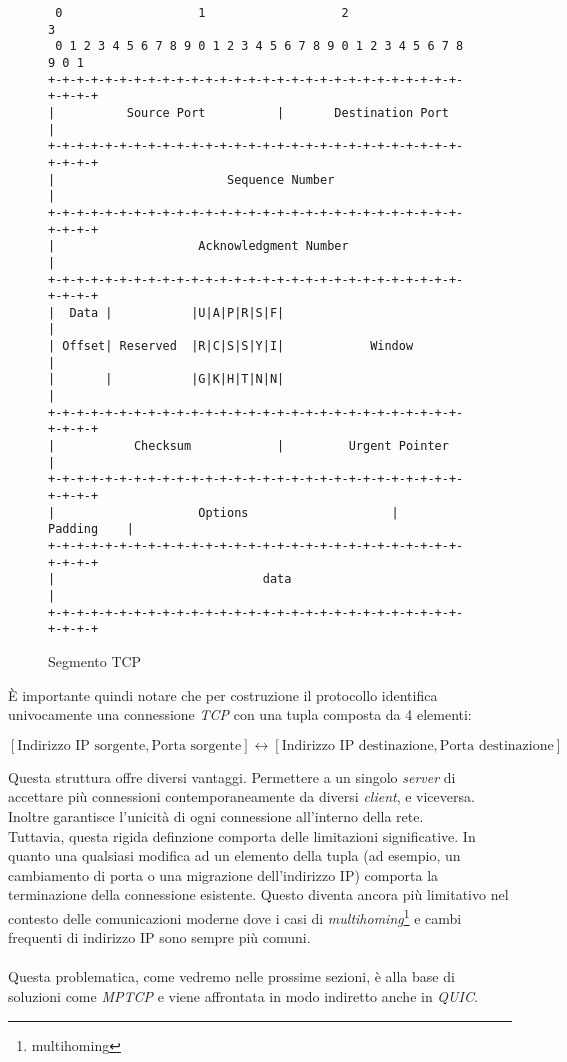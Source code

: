 \begin{figure}[!h]
\centering
\begin{BVerbatim}
 0                   1                   2                   3   
 0 1 2 3 4 5 6 7 8 9 0 1 2 3 4 5 6 7 8 9 0 1 2 3 4 5 6 7 8 9 0 1 
+-+-+-+-+-+-+-+-+-+-+-+-+-+-+-+-+-+-+-+-+-+-+-+-+-+-+-+-+-+-+-+-+
|          Source Port          |       Destination Port        |
+-+-+-+-+-+-+-+-+-+-+-+-+-+-+-+-+-+-+-+-+-+-+-+-+-+-+-+-+-+-+-+-+
|                        Sequence Number                        |
+-+-+-+-+-+-+-+-+-+-+-+-+-+-+-+-+-+-+-+-+-+-+-+-+-+-+-+-+-+-+-+-+
|                    Acknowledgment Number                      |
+-+-+-+-+-+-+-+-+-+-+-+-+-+-+-+-+-+-+-+-+-+-+-+-+-+-+-+-+-+-+-+-+
|  Data |           |U|A|P|R|S|F|                               |
| Offset| Reserved  |R|C|S|S|Y|I|            Window             |
|       |           |G|K|H|T|N|N|                               |
+-+-+-+-+-+-+-+-+-+-+-+-+-+-+-+-+-+-+-+-+-+-+-+-+-+-+-+-+-+-+-+-+
|           Checksum            |         Urgent Pointer        |
+-+-+-+-+-+-+-+-+-+-+-+-+-+-+-+-+-+-+-+-+-+-+-+-+-+-+-+-+-+-+-+-+
|                    Options                    |    Padding    |
+-+-+-+-+-+-+-+-+-+-+-+-+-+-+-+-+-+-+-+-+-+-+-+-+-+-+-+-+-+-+-+-+
|                             data                              |
+-+-+-+-+-+-+-+-+-+-+-+-+-+-+-+-+-+-+-+-+-+-+-+-+-+-+-+-+-+-+-+-+
           \end{BVerbatim}
\caption{Segmento TCP}
\label{fig}
\end{figure}

\noindent È importante quindi notare che per costruzione il protocollo identifica univocamente una connessione \emph{TCP} con una tupla composta da 4 elementi:

\begin{center}
    \small
    $[\text{Indirizzo IP sorgente}, \text{Porta sorgente}] \leftrightarrow [\text{Indirizzo IP destinazione}, \text{Porta destinazione}]$
\end{center}

\noindent Questa struttura offre diversi vantaggi. Permettere a un singolo \emph{server} di accettare più connessioni contemporaneamente da diversi \emph{client}, e viceversa. 
Inoltre garantisce l'unicità di ogni connessione all'interno della rete.
\\
Tuttavia, questa rigida definzione comporta delle limitazioni significative. In quanto una qualsiasi modifica ad un elemento della tupla (ad esempio, un cambiamento di porta o una migrazione dell'indirizzo IP) comporta la terminazione della connessione esistente. Questo diventa ancora più limitativo nel contesto delle comunicazioni moderne dove i casi di \emph{multihoming}\footnote{\gls{multihoming}} e cambi frequenti di indirizzo IP sono sempre più comuni\cite{site:tcp}. 
\\
\\
Questa problematica, come vedremo nelle prossime sezioni, è alla base di soluzioni come \emph{MPTCP} e viene affrontata in modo indiretto anche in \emph{QUIC}.

